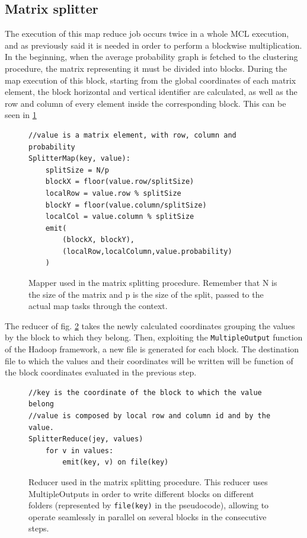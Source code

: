 \subsection{Matrix splitter}
\label{splitter}
The execution of this map reduce job occurs twice in a whole MCL execution, and as previously said it is needed in order to
perform a blockwise multiplication.
In the beginning, when the average probability graph is fetched to the clustering procedure, the matrix representing it must be
divided into blocks.
During the map execution of this block, starting from the global coordinates of each matrix element, the block horizontal
and vertical identifier are calculated, as well as the row and column of every element inside the corresponding block.
This can be seen in \ref{fig:splitterMap}

\begin{figure}[H]
\begin{verbatim}
//value is a matrix element, with row, column and probability
SplitterMap(key, value):
    splitSize = N/p
    blockX = floor(value.row/splitSize)
    localRow = value.row % splitSize
    blockY = floor(value.column/splitSize)
    localCol = value.column % splitSize
    emit(
        (blockX, blockY),
        (localRow,localColumn,value.probability)
    )
\end{verbatim}
\caption{Mapper used in the matrix splitting procedure. Remember that N is the size of the matrix and p is the size of the split, passed to the actual map tasks through the context.}
\label{fig:splitterMap}
\end{figure}
The reducer of fig. \ref{fig:splitterReduce} takes the newly calculated coordinates grouping the values by the block to which they belong.
Then, exploiting the \texttt{MultipleOutput} function of the Hadoop framework, a new file is generated for each block. The destination file
to which the values and their coordinates will be written will be function of the block coordinates evaluated in the previous step.

\begin{figure}[H]
\begin{verbatim}
//key is the coordinate of the block to which the value belong
//value is composed by local row and column id and by the value.
SplitterReduce(jey, values)
    for v in values:
        emit(key, v) on file(key)
\end{verbatim}
\caption{Reducer used in the matrix splitting procedure. This reducer uses MultipleOutputs in order to write different blocks on different folders (represented by \texttt{file(key)} in the pseudocode), allowing to operate seamlessly in parallel on several blocks in the consecutive steps.}
\label{fig:splitterReduce}
\end{figure}

